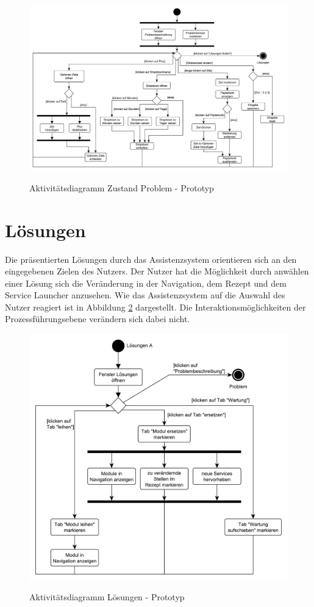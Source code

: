 \begin{figure}[tbp]
\centering
\includegraphics[angle=90,scale=0.5]{DA_files/UML/Prototyp/Aktivitaetsdiagramm-Problem.pdf}
\label{pic:Aktivitaetsdiagramm-Problem}
\caption{Aktivitätsdiagramm Zustand Problem - Prototyp}
\end{figure}

\section{Lösungen}
\label{5:Loesungen}
Die präsentierten Lösungen durch das Assistenzsystem orientieren sich an den eingegebenen Zielen des Nutzers. Der Nutzer hat die Möglichkeit durch anwählen einer Lösung sich die Veränderung in der Navigation, dem Rezept und dem Service Launcher anzusehen. Wie das Assistenzsystem auf die Auswahl des Nutzer reagiert ist in Abbildung \ref{pic:Aktivitaetsdiagramm-Loesungen} dargestellt. Die Interaktionsmöglichkeiten der Prozessführungsebene verändern sich dabei nicht.

\begin{figure}[htbp]
\centering
\includegraphics[scale=0.6]{DA_files/UML/Prototyp/Aktivitaetsdiagramm-Loesungen.pdf}
\label{pic:Aktivitaetsdiagramm-Loesungen}
\caption{Aktivitätsdiagramm Lösungen - Prototyp}
\end{figure}